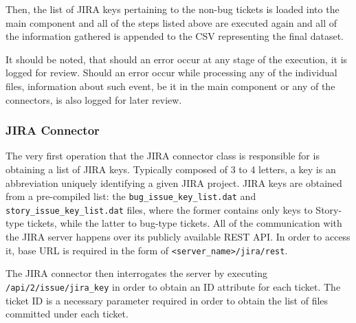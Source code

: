 Then, the list of JIRA keys pertaining to the non-bug tickets is loaded into the main component and all of the steps listed above are executed again and all of the information gathered is appended to the CSV representing the final dataset.

It should be noted, that should an error occur at any stage of the execution, it is logged for review. Should an error occur while processing any of the individual files, information about such event, be it in the main component or any of the connectors, is also logged for later review.

\subsubsection{JIRA Connector}\label{sec:source-code:jira}
The very first operation that the JIRA connector class is responsible for is obtaining a list of JIRA keys. Typically composed of 3 to 4 letters, a key is an abbreviation uniquely identifying a given JIRA project. JIRA keys are obtained from a pre-compiled list: the \texttt{bug\_issue\_key\_list.dat} and \texttt{story\_issue\_key\_list.dat} files, where the former contains only keys to Story-type tickets, while the latter to bug-type tickets. 
All of the communication with the JIRA server happens over its publicly available REST API. In order to access it, base URL is required in the form of \texttt{<server_name>/jira/rest}.

The JIRA connector then interrogates the server by executing \texttt{/api/2/issue/{jira_key}} in order to obtain an ID attribute for each ticket. The ticket ID is a necessary parameter required in order to obtain the list of files committed under each ticket.

